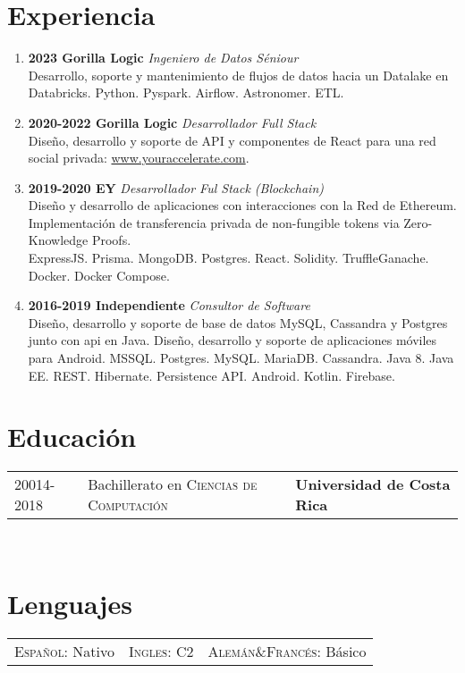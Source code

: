 \documentclass[a4paper,11pt]{article}
\begin{document}
\section{Experiencia}
\begin{enumerate}
    \item \textbf{2023 Gorilla Logic} \emph{Ingeniero de Datos Séniour} \\
    Desarrollo, soporte y mantenimiento de flujos de datos hacia un Datalake en Databricks. 
    Python. Pyspark. Airflow. Astronomer. ETL. 
    \item\textbf{2020-2022 Gorilla Logic} \emph{Desarrollador Full Stack} \\
    Diseño, desarrollo y soporte de API y componentes de React para una red social privada: \url{www.youraccelerate.com}. 
    \item \textbf{2019-2020 EY}   \emph{Desarrollador Ful Stack (Blockchain)} \\
    Diseño y desarrollo de aplicaciones con interacciones con la Red de Ethereum. Implementación de transferencia privada de non-fungible tokens via Zero-Knowledge Proofs. \\
    ExpressJS. Prisma. MongoDB. Postgres. React. Solidity. TruffleGanache. Docker. Docker Compose.
    \item \textbf{2016-2019 Independiente} \emph{Consultor de Software} \\
    Diseño, desarrollo y soporte de base de datos MySQL, Cassandra y Postgres junto con api en Java. Diseño, desarrollo y soporte de aplicaciones móviles para Android.
    MSSQL. Postgres. MySQL. MariaDB. Cassandra. Java 8. Java EE. REST. Hibernate. Persistence API. Android. Kotlin. Firebase. \\
\end{enumerate}

\section{Educación}
\begin{tabular}{lll}\\
 \textsc{20014-2018} \quad & Bachillerato en  \textsc{Ciencias de Computación} \quad& \textbf{Universidad de Costa Rica}\quad\\
\end{tabular}\\

\section{Lenguajes}
\begin{tabular}{lll}\\
\textsc{Español:} Nativo \quad &\textsc{Ingles:} C2 \quad &\textsc{Alemán\&Francés:} Básico\quad \\
\end{tabular}\\
\vspace{5mm} %
\end{document}
